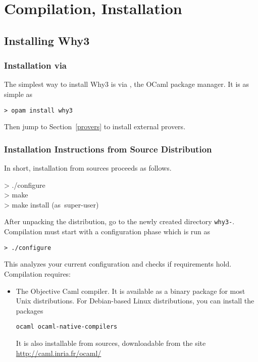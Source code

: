 
\chapter{Compilation, Installation}
\label{sec:install}

\section{Installing Why3}

\subsection{Installation via \opam}

The simplest way to install Why3 is via \opam, the OCaml
package manager. It is as simple as
\begin{verbatim}
> opam install why3
\end{verbatim}
Then jump to Section~\ref{provers} to install external provers.

\subsection{Installation Instructions from Source Distribution}

In short, installation from sources proceeds as follows.
\begin{flushleft}\ttfamily
  > ./configure\\
  > make\\
  > make install \mbox{\rmfamily (as super-user)}
\end{flushleft}

After unpacking the distribution, go to the newly created directory
\texttt{why3-\whyversion}. Compilation must start with a
configuration phase which is run as
\begin{verbatim}
> ./configure
\end{verbatim}
This analyzes your current configuration and checks if requirements hold.
Compilation requires:
\begin{itemize}
\item The Objective Caml compiler. It is
  available as a binary package for most Unix distributions. For
  Debian-based Linux distributions, you can install the packages
\begin{verbatim}
ocaml ocaml-native-compilers
\end{verbatim}
It is also installable from sources, downloadable from the site
\url{http://caml.inria.fr/ocaml/}
\end{itemize}

